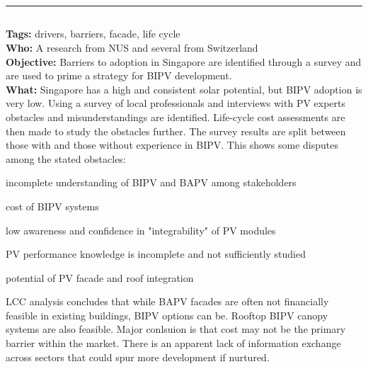 \documentclass[11pt,a4paper]{article}
\makeatletter
\renewcommand{\maketitle}{\bgroup
   \begin{center}
   \textbf{{\fontsize{18pt}{20}\selectfont \@title}}\\
   \vspace{10pt}
   {\fontsize{12pt}{0}\selectfont \@author} 
   \end{center}
}
\newenvironment{itemize*}%
  {\begin{itemize}[rightmargin=\dimexpr\linewidth-120mm-\leftmargin\relax]%
    \setlength{\itemsep}{0pt}%
    \setlength{\parskip}{0pt}}%
  {\end{itemize}}
\makeatother
\begin{document}

\thispagestyle{fancy}


\noindent\rule{\textwidth}{1pt}
\subsection*{}
\textbf{Tags:} drivers, barriers, facade, life cycle \\
\textbf{Who:} A research from NUS and several from Switzerland \\
\textbf{Objective:} Barriers to adoption in Singapore are identified through a survey and are used to prime a strategy for BIPV development. \\
\textbf{What:} Singapore has a high and consistent solar potential, but BIPV adoption is very low. Using a survey of local professionals and interviews with PV experts obstacles and misunderstandings are identified. Life-cycle cost assessments are then made to study the obstacles further. The survey results are split between those with and those without experience in BIPV. This shows some disputes among the stated obstacles:

\begin{itemize*}
    \item incomplete understanding of BIPV and BAPV among stakeholders
    \item cost of BIPV systems
    \item low awareness and confidence in "integrability" of PV modules
    \item PV performance knowledge is incomplete and not sufficiently studied
    \item potential of PV facade and roof integration 
\end{itemize*}

LCC analysis concludes that while BAPV facades are often not financially feasible in existing buildings, BIPV options can be. Rooftop BIPV canopy systems are also feasible. Major conlsuion is that cost may not be the primary barrier within the market. There is an apparent lack of information exchange across sectors that could spur more development if nurtured. 
\end{document}
